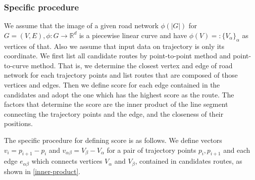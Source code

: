 \documentclass{article}
\numberwithin{equation}{section}
\theoremstyle{definition}
\begin{document}
\subsubsection*{Specific procedure}
We assume that the image of a given road network $\phi(|G|)$ for $G=(V,E), \phi:G\to\mathbb{R}^{d}$ is a piecewise linear curve and have $\phi(V)=:\{V_{\alpha}\}_{\alpha}$ as vertices of that. Also we assume that input data on trajectory is only its coordinate.
We first list all candidate routes by point-to-point method and point-to-curve method.
That is, we determine the closest vertex and edge of road network for each trajectory points and list routes that are composed of those vertices and edges.
Then we define score for each edge contained in the candidates and adopt the one which has the highest score as the route.  
The factors that determine the score are the inner product of the line segment connecting the trajectory points and the edge, and the closeness of their positions.

The specific procedure for defining score is as follows.
We define vectors $v_{i} = p_{i+1}-p_{i}$ and $v_{\alpha\beta} = V_{\beta}-V_{\alpha}$ for a pair of trajectory points $p_{i}, p_{i+1}$ and each edge $e_{\alpha\beta}$ which connects vertices $V_{\alpha}$ and $V_{\beta}$, contained in candidates routes, as shown in \autoref{inner-product}.
\end{document}
